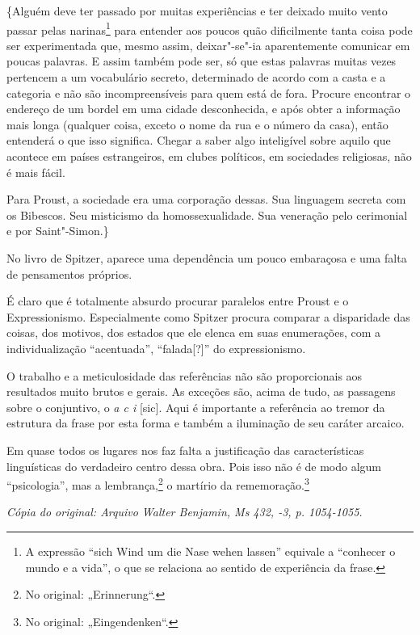 \{Alguém deve ter passado por muitas experiências e ter deixado muito
vento passar pelas narinas\footnote{A expressão ``sich Wind um die
  Nase wehen lassen'' equivale a ``conhecer o mundo e a vida'', o que se
  relaciona ao sentido de experiência da frase. \versal{[N. T.]}} para entender aos
poucos quão dificilmente tanta coisa pode ser experimentada que, mesmo
assim, deixar"-se"-ia aparentemente comunicar em poucas palavras. E assim
também pode ser, só que estas palavras muitas vezes pertencem a um
vocabulário secreto, determinado de acordo com a casta e a categoria e %
não são incompreensíveis para quem está de fora. Procure encontrar o
endereço de um bordel em uma cidade desconhecida, e após obter a
informação mais longa (qualquer coisa, exceto o nome da rua e o número da
casa), então entenderá o que isso significa. Chegar a saber algo
inteligível sobre aquilo que acontece em países estrangeiros, em clubes
políticos, em sociedades religiosas, não é mais fácil.

Para Proust, a sociedade era uma corporação dessas. Sua linguagem
secreta com os Bibescos. Seu misticismo da homossexualidade. Sua
veneração pelo cerimonial e por Saint"-Simon.\}

No livro de Spitzer, aparece uma dependência um pouco embaraçosa e uma
falta de pensamentos próprios.

É claro que é totalmente absurdo procurar paralelos entre Proust e o
Expressionismo. Especialmente como Spitzer procura comparar a disparidade
das coisas, dos motivos, dos estados que ele elenca em suas enumerações,
com a individualização ``acentuada'', ``falada{[}?{]}'' do expressionismo.

O trabalho e a meticulosidade das referências não são proporcionais aos
resultados muito brutos e gerais. As exceções são, acima de tudo, as
passagens sobre o conjuntivo, o \emph{a c i} {[}sic{]}. Aqui é
importante a referência ao tremor da estrutura da frase por esta forma e
também a iluminação de seu caráter arcaico.

Em quase todos os lugares nos faz falta a justificação das
características linguísticas do verdadeiro centro dessa obra. Pois isso
não é de modo algum ``psicologia'', mas a lembrança,\footnote{No
  original: „Erinnerung“. \versal{[N. T.]}} o martírio da rememoração.\footnote{No original: „Eingendenken“. \versal{[N. T.]}}

\begin{flushright}
\emph{\small{Cópia do original: Arquivo Walter Benjamin, Ms 432, -3, p. 1054-1055.}}
\end{flushright}

